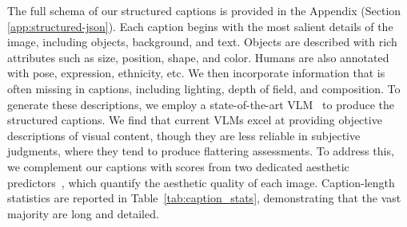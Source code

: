 


The full schema of our structured captions is provided in the Appendix (Section \ref{app:structured-json}). Each caption begins with the most salient details of the image, including objects, background, and text. Objects are described with rich attributes such as size, position, shape, and color. Humans are also annotated with pose, expression, ethnicity, etc. We then incorporate information that is often missing in captions, including lighting, depth of field, and composition. To generate these descriptions, we employ a state-of-the-art VLM~\cite{comanici2025gemini} to produce the structured captions. We find that current VLMs excel at providing objective descriptions of visual content, though they are less reliable in subjective judgments, where they tend to produce flattering assessments. To address this, we complement our captions with scores from two dedicated aesthetic predictors~\cite{kirstain2023pick,laion2022_aesthetics_v1}, which quantify the aesthetic quality of each image. Caption-length statistics are reported in Table~\ref{tab:caption_stats}, demonstrating that the vast majority are long and detailed.









